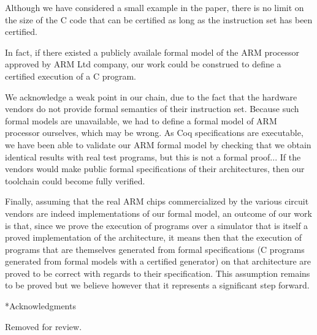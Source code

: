 \documentclass[twocolumn]{article}
\makeatletter
\def\section{\@startsection {section}{1}{\z@}{20pt plus 2pt minus 2pt}
{8pt plus 2pt minus 2pt}{\centering\normalsize\sc
\edef\@svsec{\thesection.\ }}}
\def\thesection{\Roman{section}}
\makeatother
\begin{document}
Although we have considered a small example in the paper, there is no
limit on the size of the C code that can be certified as long as
the instruction set has been certified.

In fact, if there existed a publicly availale formal model of the ARM
processor approved by ARM Ltd company, our work could be construed
to define a certified execution of a C program.

We acknowledge a weak point in our chain, due to the fact that the
hardware vendors do not provide formal semantics of their instruction
set. Because such formal models are unavailable, we had to define a
formal model of ARM processor ourselves, which may be wrong.  As Coq
specifications are executable, we have been able to validate our ARM
formal model by checking that we obtain identical results with real
test programs, but this is not a formal proof... If the vendors would
make public formal specifications of their architectures, then our
toolchain could become fully verified.

Finally, assuming that the real ARM chips commercialized by the
various circuit vendors are indeed implementations of our formal
model, an outcome of our work is that, since we prove the execution of
programs over a simulator that is itself a proved implementation of
the architecture, it means then that the execution of programs that
are themselves generated from formal specifications (C programs
generated from formal models with a certified generator) on that
architecture are proved to be correct with regards to their
specification. This assumption remains to be proved but we believe
however that it represents a significant step forward.


\section*{Acknowledgments}

Removed for review.





\end{document}

